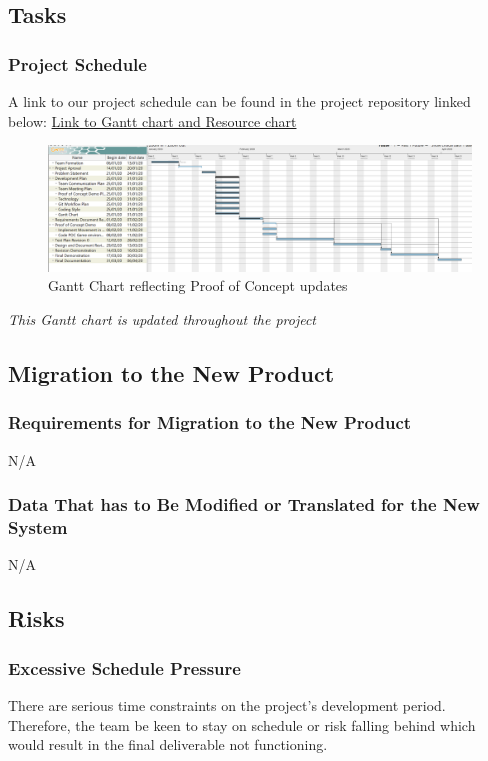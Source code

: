 \documentclass[12pt, titlepage]{article}
\begin{document}
\subsection{Tasks}
\subsubsection{Project Schedule}
A link to our project schedule can be found in the project repository linked below:
\href{https://gitlab.cas.mcmaster.ca/jandricd/super-refactored-mario-bros/tree/master/ProjectSchedule}{Link to Gantt chart and Resource chart}

\begin{figure}[H]
    \centering
    \includegraphics[width=\textwidth]{GanttChartSnapshotFeb9.png}
    \caption{Gantt Chart reflecting Proof of Concept updates}
    \label{fig:ganttchart}
\end{figure}

{\it This Gantt chart is updated throughout the project}

\subsection{Migration to the New Product}
\subsubsection{Requirements for Migration to the New Product}
N/A

\subsubsection{Data That has to Be Modified or Translated for the New System}
N/A

\subsection{Risks}
\subsubsection{Excessive Schedule Pressure}
There are serious time constraints on the project's development period. Therefore, the team be keen to stay on schedule or risk falling behind which would result in the final deliverable not functioning.
\end{document}
